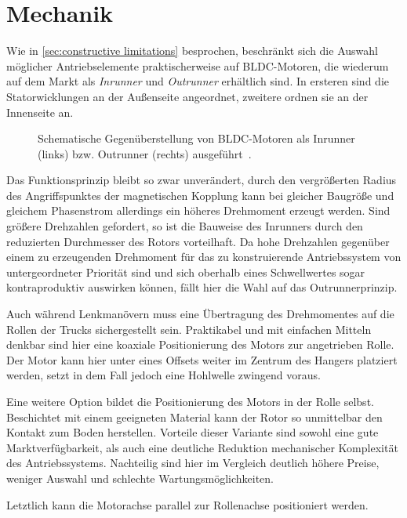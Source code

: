 \chapter{Mechanik}
	Wie in \cref{sec:constructive limitations} besprochen, beschränkt sich die Auswahl möglicher Antriebselemente praktischerweise auf BLDC-Motoren, die wiederum auf dem Markt als \textit{Inrunner} und \textit{Outrunner} erhältlich sind.
	In ersteren sind die Statorwicklungen an der Außenseite angeordnet, zweitere ordnen sie an der Innenseite an.
	\begin{figure}[h]
		\centering
		
		\caption[Gegenüberstellung von Inrunner und Outrunner]{Schematische Gegenüberstellung von BLDC-Motoren als Inrunner (links) bzw. Outrunner (rechts) ausgeführt~\cite{inrunner.outrunner.2022}.}%
		\label{fig:inrunner outrunner}
	\end{figure}
	Das Funktionsprinzip bleibt so zwar unverändert, durch den vergrößerten Radius des Angriffspunktes der magnetischen Kopplung kann bei gleicher Baugröße und gleichem Phasenstrom allerdings ein höheres Drehmoment erzeugt werden.
	Sind größere Drehzahlen gefordert, so ist die Bauweise des Inrunners durch den reduzierten Durchmesser des Rotors vorteilhaft.
	Da hohe Drehzahlen gegenüber einem zu erzeugenden Drehmoment für das zu konstruierende Antriebssystem von untergeordneter Priorität sind und sich oberhalb eines Schwellwertes sogar kontraproduktiv auswirken können, fällt hier die Wahl auf das Outrunnerprinzip.\par\medskip
	Auch während Lenkmanövern muss eine Übertragung des Drehmomentes auf die Rollen der Trucks sichergestellt sein.
	Praktikabel und mit einfachen Mitteln denkbar sind hier eine koaxiale Positionierung des Motors zur angetrieben Rolle.
	Der Motor kann hier unter eines Offsets weiter im Zentrum des Hangers platziert werden, setzt in dem Fall jedoch eine Hohlwelle zwingend voraus.\par
	Eine weitere Option bildet die Positionierung des Motors in der Rolle selbst.
	Beschichtet mit einem geeigneten Material kann der Rotor so unmittelbar den Kontakt zum Boden herstellen.
	Vorteile dieser Variante sind sowohl eine gute Marktverfügbarkeit, als auch eine deutliche Reduktion mechanischer Komplexität des Antriebssystems.
	Nachteilig sind hier im Vergleich deutlich höhere Preise, weniger Auswahl und schlechte Wartungsmöglichkeiten.\par
	Letztlich kann die Motorachse parallel zur Rollenachse positioniert werden.
